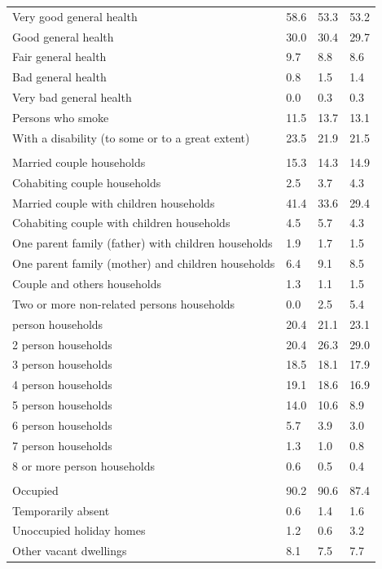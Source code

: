 \documentclass{article}
\begin{document}
\begin{table}[h]
\begin{tabular}{KTTT}
Very good general health & 58.6& 53.3& 53.2\\
Good general health & 30.0& 30.4& 29.7\\
Fair general health & 9.7& 8.8& 8.6\\
Bad general health & 0.8& 1.5& 1.4\\
Very bad general health & 0.0& 0.3& 0.3\\
    \hline
Persons who smoke & 11.5& 13.7& 13.1\\
    \hline
With a disability (to some or to a great extent) & 23.5& 21.9& 21.5\\
\hline
    \\ 
    \hline
Married couple households & 15.3& 14.3& 14.9\\
Cohabiting couple households & 2.5& 3.7& 4.3\\
Married couple with children households & 41.4& 33.6& 29.4\\
Cohabiting couple with children households & 4.5& 5.7& 4.3\\
One parent family (father) with  children households & 1.9& 1.7& 1.5\\
One parent family (mother) and children households & 6.4& 9.1& 8.5\\
Couple and others households  & 1.3& 1.1& 1.5\\
Two or more non-related persons households & 0.0& 2.5& 5.4\\
     person households & 20.4& 21.1& 23.1\\
2 person households & 20.4& 26.3& 29.0\\
3 person households & 18.5& 18.1& 17.9\\
4 person households & 19.1& 18.6& 16.9\\
5 person households & 14.0& 10.6&  8.9\\
6 person households & 5.7& 3.9& 3.0\\
7 person households & 1.3& 1.0& 0.8\\
8 or more person households & 0.6& 0.5& 0.4\\
\hline
    \\ 
    \hline
Occupied & 90.2& 90.6& 87.4\\
Temporarily absent & 0.6& 1.4& 1.6\\
Unoccupied holiday homes & 1.2& 0.6& 3.2\\
Other vacant dwellings & 8.1& 7.5& 7.7\\
\hline
\end{tabular}
\end{table}
\end{document}
